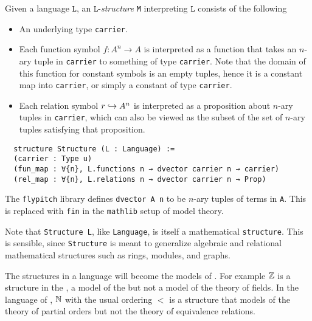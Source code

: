 \begin{dfn}[Structures]
    Given a language $\texttt{L}$, an $\texttt{L}$-\textit{structure} \texttt{M}
    interpreting $\texttt{L}$ consists of the following
    \begin{itemize}
      \item An underlying type \texttt{carrier}.
      \item Each function symbol $f : A^{n} \to A$ is interpreted as a
            function that takes an $n$-ary tuple in \texttt{carrier}
            to something of type \texttt{carrier}.
            Note that the domain of this function for constant symbols is an empty tuples,
            hence it is a constant map into \texttt{carrier},
            or simply a constant of type \texttt{carrier}.
      \item Each relation symbol $r \hookrightarrow A^{n}$
            is interpreted as a proposition about $n$-ary tuples in \texttt{carrier},
            which can also be viewed as the subset of the set of $n$-ary tuples
            satisfying that proposition.
    \end{itemize}

  \begin{lstlisting}
  structure Structure (L : Language) :=
  (carrier : Type u)
  (fun_map : ∀{n}, L.functions n → dvector carrier n → carrier)
  (rel_map : ∀{n}, L.relations n → dvector carrier n → Prop)\end{lstlisting}

  The \texttt{flypitch} library defines \texttt{dvector A n} to be
  $n$-ary tuples of terms in \texttt{A}.
  This is replaced with \texttt{fin} in the \texttt{mathlib} setup of model theory.

  Note that \texttt{Structure L}, like \texttt{Language},
  is itself a mathematical \texttt{structure}.
  This is sensible, since \texttt{Structure} is meant to generalize algebraic
  and relational mathematical structures such as rings, modules, and graphs.
\end{dfn}

The structures in a language will become the models of .
For example $\mathbb{Z}$ is a structure in the ,
a model of the  but not a model of the theory of fields.
In the language of ,
$\mathbb{N}$ with the usual ordering $<$ is a structure that models of
the theory of partial orders but not the theory of equivalence relations.

